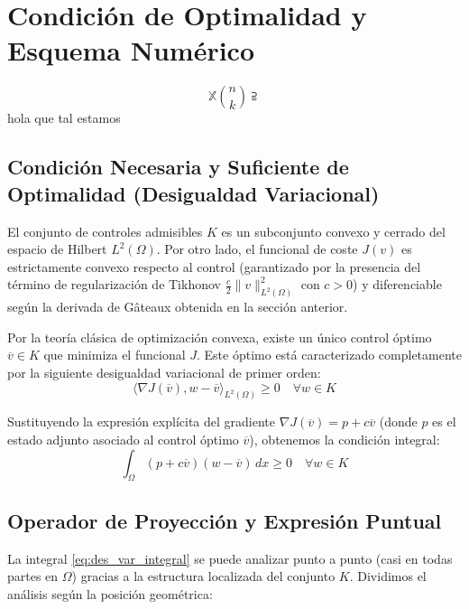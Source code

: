 \documentclass[11pt,a4paper]{article}
\begin{document}
	\section{Condición de Optimalidad y Esquema Numérico}
	\begin{equation}
		\label{Bobota}
		\mathbb{X} \binom{n}{k}\supseteqq  
	\end{equation}
	hola que tal estamos 
	\subsection{Condición Necesaria y Suficiente de Optimalidad (Desigualdad Variacional)}
	El conjunto de controles admisibles $K$ es un subconjunto convexo y cerrado del espacio de Hilbert $L^2(\Omega)$. Por otro lado, el funcional de coste $J(v)$ es estrictamente convexo respecto al control (garantizado por la presencia del término de regularización de Tikhonov $\frac{c}{2} \|v\|^2_{L^2(\Omega)}$ con $c > 0$) y diferenciable según la derivada de Gâteaux obtenida en la sección anterior.
	
	Por la teoría clásica de optimización convexa, existe un único control óptimo $\overline{v} \in K$ que minimiza el funcional $J$. Este óptimo está caracterizado completamente por la siguiente desigualdad variacional de primer orden:
	\begin{equation} \label{eq:desigualdad_variacional}
		\langle \nabla J(\overline{v}), w - \overline{v} \rangle_{L^2(\Omega)} \ge 0 \quad \forall w \in K
	\end{equation}
	
	Sustituyendo la expresión explícita del gradiente $\nabla J(\overline{v}) = p + c\overline{v}$ (donde $p$ es el estado adjunto asociado al control óptimo $\overline{v}$), obtenemos la condición integral:
	\begin{equation} \label{eq:des_var_integral}
		\int_\Omega (p + c\overline{v})(w - \overline{v}) \, dx \ge 0 \quad \forall w \in K
	\end{equation}
	
	\subsection{Operador de Proyección y Expresión Puntual}
	La integral \eqref{eq:des_var_integral} se puede analizar punto a punto (casi en todas partes en $\Omega$) gracias a la estructura localizada del conjunto $K$. Dividimos el análisis según la posición geométrica:
	
\end{document}
